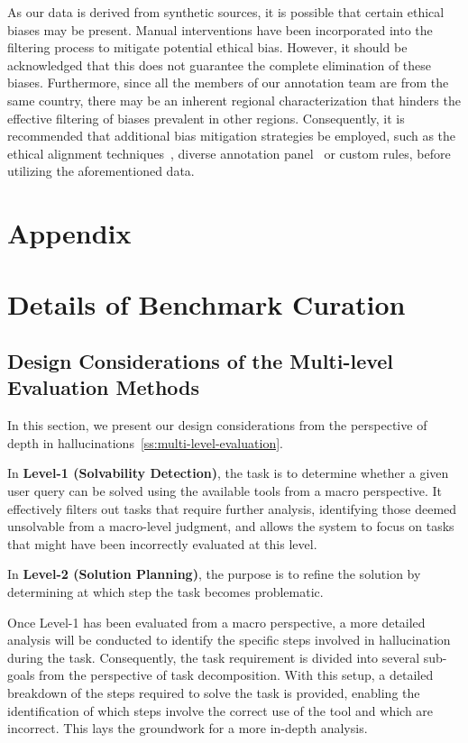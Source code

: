 \documentclass[11pt]{article}
\begin{document}
As our data is derived from synthetic sources, it is possible that certain ethical biases may be present. 
Manual interventions have been incorporated into the filtering process to mitigate potential ethical bias. 
However, it should be acknowledged that this does not guarantee the complete elimination of these biases. 
Furthermore, since all the members of our annotation team are from the same country, there may be an inherent regional characterization that hinders the effective filtering of biases prevalent in other regions.
Consequently, it is recommended that additional bias mitigation strategies be employed, such as the ethical alignment techniques~\cite{DBLP:conf/sigir-ap/YuWZZYS23@ethical}, diverse annotation panel~\cite{shi2024chartmimic} or custom rules, before utilizing the aforementioned data.



\clearpage
\appendix
\section*{Appendix}

\section{Details of Benchmark Curation}
\label{append:details-benchmark}

\subsection{Design Considerations of the Multi-level Evaluation Methods}
\label{append:necessity-multi-level}

In this section, we present our design considerations from the perspective of depth in hallucinations~\cref{ss:multi-level-evaluation}. 

In \textbf{Level-1 (Solvability Detection)}, the task is to determine whether a given user query can be solved using the available tools from a macro perspective. 
It effectively filters out tasks that require further analysis, identifying those deemed unsolvable from a macro-level judgment, and allows the system to focus on tasks that might have been incorrectly evaluated at this level.

In \textbf{Level-2 (Solution Planning)}, the purpose is to refine the solution by determining at which step the task becomes problematic.

Once Level-1 has been evaluated from a macro perspective, a more detailed analysis will be conducted to identify the specific steps involved in hallucination during the task.
Consequently, the task requirement is divided into several sub-goals from the perspective of task decomposition. 
With this setup, a detailed breakdown of the steps required to solve the task is provided, enabling the identification of which steps involve the correct use of the tool and which are incorrect. 
This lays the groundwork for a more in-depth analysis.
\end{document}
